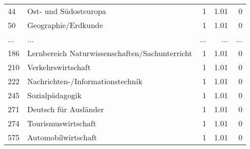 \begin{longtable}{lXrrr}
        44 & \multicolumn{1}{X}{Ost- und Südosteuropa} & %
          \num{1} &
          \num[round-mode=places,round-precision=2]{1.01} &
          \num[round-mode=places,round-precision=2]{0} \\
        50 & \multicolumn{1}{X}{Geographie/Erdkunde} & %
          \num{1} &
          \num[round-mode=places,round-precision=2]{1.01} &
          \num[round-mode=places,round-precision=2]{0} \\
       ... & ... & ... & ... & ... \\
        186 & \multicolumn{1}{X}{Lernbereich Naturwissenschaften/Sachunterricht} & %
          \num{1} &
          \num[round-mode=places,round-precision=2]{1.01} &
          \num[round-mode=places,round-precision=2]{0} \\

        210 & \multicolumn{1}{X}{Verkehrswirtschaft} & %
          \num{1} &
          \num[round-mode=places,round-precision=2]{1.01} &
          \num[round-mode=places,round-precision=2]{0} \\

        222 & \multicolumn{1}{X}{Nachrichten-/Informationstechnik} & %
          \num{1} &
          \num[round-mode=places,round-precision=2]{1.01} &
          \num[round-mode=places,round-precision=2]{0} \\

        245 & \multicolumn{1}{X}{Sozialpädagogik} & %
          \num{1} &
          \num[round-mode=places,round-precision=2]{1.01} &
          \num[round-mode=places,round-precision=2]{0} \\

        271 & \multicolumn{1}{X}{Deutsch für Ausländer} & %
          \num{1} &
          \num[round-mode=places,round-precision=2]{1.01} &
          \num[round-mode=places,round-precision=2]{0} \\

        274 & \multicolumn{1}{X}{Tourismuswirtschaft} & %
          \num{1} &
          \num[round-mode=places,round-precision=2]{1.01} &
          \num[round-mode=places,round-precision=2]{0} \\

        575 & \multicolumn{1}{X}{Automobilwirtschaft} & %
          \num{1} &
          \num[round-mode=places,round-precision=2]{1.01} &
          \num[round-mode=places,round-precision=2]{0} \\


\end{longtable}
